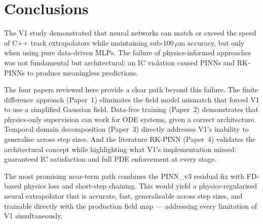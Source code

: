 \documentclass[12pt,a4paper]{article}
\begin{document}
\section{Conclusions}
\label{sec:conclusions}

The V1 study demonstrated that neural networks can match or exceed the speed of C++ track extrapolators while maintaining sub-100\,$\mu$m accuracy, but only when using pure data-driven MLPs. The failure of physics-informed approaches was not fundamental but architectural: an IC violation caused PINNs and RK-PINNs to produce meaningless predictions.

The four papers reviewed here provide a clear path beyond this failure. The finite difference approach (Paper~1) eliminates the field model mismatch that forced V1 to use a simplified Gaussian field. Data-free training (Paper~2) demonstrates that physics-only supervision can work for ODE systems, given a correct architecture. Temporal domain decomposition (Paper~3) directly addresses V1's inability to generalise across step sizes. And the literature RK-PINN (Paper~4) validates the architectural concept while highlighting what V1's implementation missed: guaranteed IC satisfaction and full PDE enforcement at every stage.

The most promising near-term path combines the PINN\_v3 residual fix with FD-based physics loss and short-step chaining. This would yield a physics-regularised neural extrapolator that is accurate, fast, generalisable across step sizes, and trainable directly with the production field map --- addressing every limitation of V1 simultaneously.
\end{document}
